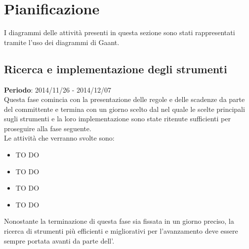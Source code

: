%
%


\section{Pianificazione} %
\label{sec:pianificazione}
I diagrammi delle attività presenti in questa sezione sono stati rappresentati tramite l'uso dei diagrammi di Gaant.
	\subsection{Ricerca e implementazione degli strumenti} %
	\label{sub:ricerca_e_implementazione_degli_strumenti}
	\textbf{Periodo}: 2014/11/26 - 2014/12/07 \\
	Questa fase comincia con la presentazione delle regole e delle scadenze da parte del committente e termina con un giorno scelto dal \roleProjectManager{} nel quale le scelte principali sugli strumenti e la loro implementazione sono state ritenute sufficienti per proseguire alla fase seguente. \\
	Le attività che verranno svolte sono:
		\begin{itemize}
			\item TO DO
			\item TO DO
			\item TO DO
			\item TO DO
		\end{itemize}
	\noindent
	Nonostante la terminazione di questa fase sia fissata in un giorno preciso, la ricerca di strumenti più efficienti e migliorativi per l'avanzamento deve essere sempre portata avanti da parte dell'\roleAdministrator.
	 
